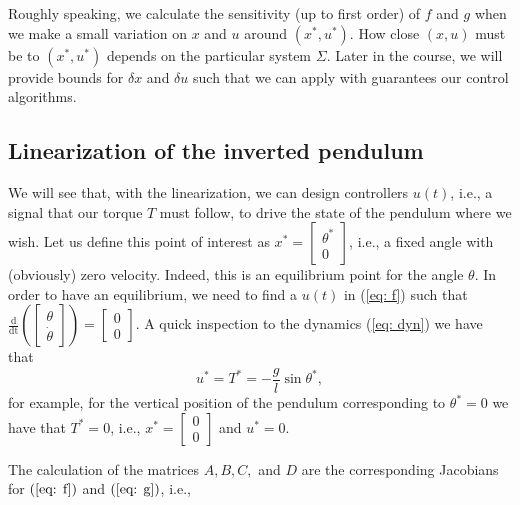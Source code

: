 Roughly speaking, we calculate the sensitivity (up to first order) of $f$ and $g$ when we make a small variation on $x$ and $u$ around $(x^*,u^*)$. How close $(x,u)$ must be to $(x^*,u^*)$ depends on the particular system $\Sigma$. Later in the course, we will provide bounds for $\delta x$ and $\delta u$ such that we can apply with guarantees our control algorithms.

\subsection{Linearization of the inverted pendulum}
We will see that, with the linearization, we can design controllers $u(t)$, i.e., a signal that our torque $T$ must follow, to drive the state of the pendulum where we wish. Let us define this point of interest as $x^* = \begin{bmatrix}\theta^* \\ 0\end{bmatrix}$, i.e., a fixed angle with (obviously) zero velocity. Indeed, this is an equilibrium point for the angle $\theta$. In order to have an equilibrium, we need to find a $u(t)$ in (\ref{eq: f}) such that $\frac{\mathrm{d}}{\mathrm{dt}}\left(\begin{bmatrix}\theta \\ \dot\theta \end{bmatrix}\right) = \begin{bmatrix}0 \\ 0 \end{bmatrix}$. A quick inspection to the dynamics (\ref{eq: dyn}) we have that
\begin{equation}
	u^* = T^* = -\frac{g}{l}\sin\theta^*,
\end{equation}
for example, for the vertical position of the pendulum corresponding to $\theta^* = 0$ we have that $T^*=0$, i.e., $x^* = \begin{bmatrix}0\\0\end{bmatrix}$ and $u^* = 0$.

The calculation of the matrices $A,B,C,$ and $D$ are the corresponding Jacobians for $(\ref{eq: f})$ and $(\ref{eq: g})$, i.e.,

